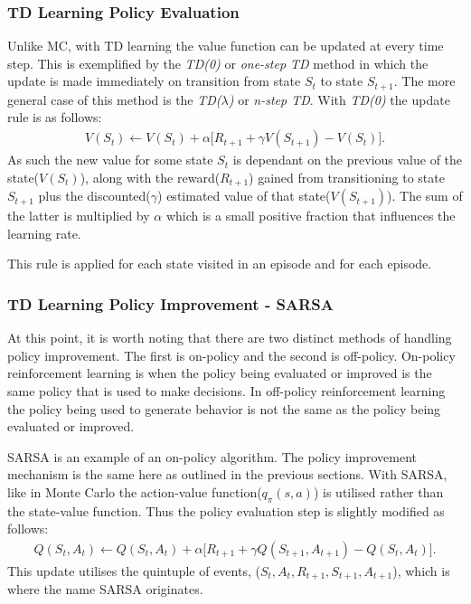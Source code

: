 \subsubsection{TD Learning Policy Evaluation}
Unlike MC, with TD learning the value function can be updated at every time step.
This is exemplified by the \textit{TD(0)} or \textit{one-step TD} method in which the
update is made immediately on transition from state $S_t$ to state $S_{t+1}$.
The more general case of this method is the \textit{TD($\lambda$)} or \textit{n-step TD}.
With \textit{TD(0)} the update rule is as follows:
\begin{align}
    V(S_t) \leftarrow V(S_t) + \alpha \lbrack R_{t+1} + \gamma V(S_{t+1}) - V(S_t) \rbrack.
\end{align}
As such the new value for some state $S_t$ is dependant on the previous value of the state($V(S_t)$),
along with the reward($R_{t+1}$) gained from transitioning to state $S_{t+1}$ plus the discounted($\gamma$)
estimated value of that state($V(S_{t+1})$).
The sum of the latter is multiplied by $\alpha$ which is a small positive fraction that influences the
learning rate.

This rule is applied for each state visited in an episode and for each episode.

\subsubsection{TD Learning Policy Improvement - SARSA}
At this point, it is worth noting that there are two distinct methods of handling policy improvement.
The first is on-policy and the second is off-policy.
On-policy reinforcement learning is when the policy being evaluated or improved is the same policy that is used
to make decisions.
In off-policy reinforcement learning the policy being used to generate behavior is not the same as the policy
being evaluated or improved.

SARSA is an example of an on-policy algorithm.
The policy improvement mechanism is the same here as outlined in the previous sections.
With SARSA, like in Monte Carlo the action-value function($q_{\pi}(s, a)$) is utilised rather
than the state-value function.
Thus the policy evaluation step is slightly modified as follows:
\begin{align}
    Q(S_t, A_t) \leftarrow Q(S_t, A_t) + \alpha \lbrack R_{t+1} + \gamma Q(S_{t+1}, A_{t+1}) - Q(S_t, A_t) \rbrack.
\end{align}
This update utilises the quintuple of events, ($S_t, A_t, R_{t+1}, S_{t+1}, A_{t+1}$), which is where the
name SARSA originates.


